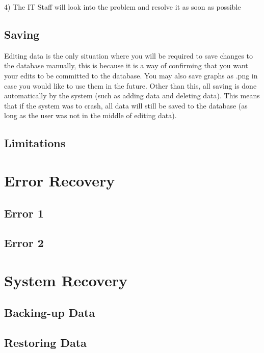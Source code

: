 4) The IT Staff will look into the problem and resolve it as soon as possible

\subsection{Saving}

Editing data is the only situation where you will be required to save changes to the database manually, this is because it is a way of confirming that you want your edits to be committed to the database. You may also save graphs as .png in case you would like to use them in the future. Other than this, all saving is done automatically by the system (such as adding data and deleting data). This means that if the system was to crash, all data will still be saved to the database (as long as the user was not in the middle of editing data).

\subsection{Limitations}

\section{Error Recovery}

\subsection{Error 1}

\subsection{Error 2}

\section{System Recovery}

\subsection{Backing-up Data}

\subsection{Restoring Data}